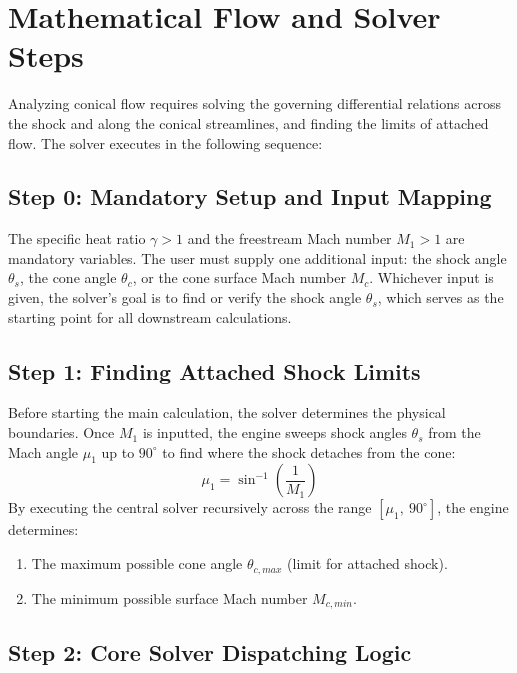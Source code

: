 \section{Mathematical Flow and Solver Steps}

Analyzing conical flow requires solving the governing differential relations across the shock and along the conical streamlines, and finding the limits of attached flow. The solver executes in the following sequence:

\subsection*{Step 0: Mandatory Setup and Input Mapping}

The specific heat ratio $\gamma > 1$ and the freestream Mach number $M_1 > 1$ are mandatory variables. The user must supply one additional input: the shock angle $\theta_s$, the cone angle $\theta_c$, or the cone surface Mach number $M_c$. Whichever input is given, the solver's goal is to find or verify the shock angle $\theta_s$, which serves as the starting point for all downstream calculations.

\subsection*{Step 1: Finding Attached Shock Limits}

Before starting the main calculation, the solver determines the physical boundaries. Once $M_1$ is inputted, the engine sweeps shock angles $\theta_s$ from the Mach angle $\mu_1$ up to $90^\circ$ to find where the shock detaches from the cone:
\begin{equation}
\mu_1 = \sin^{-1}\left(\frac{1}{M_1}\right)
\end{equation}
By executing the central solver recursively across the range $[\mu_1,\ 90^\circ]$, the engine determines:
\begin{enumerate}[nosep]
    \item The maximum possible cone angle $\theta_{c,max}$ (limit for attached shock).
    \item The minimum possible surface Mach number $M_{c,min}$.
\end{enumerate}

\subsection*{Step 2: Core Solver Dispatching Logic}

